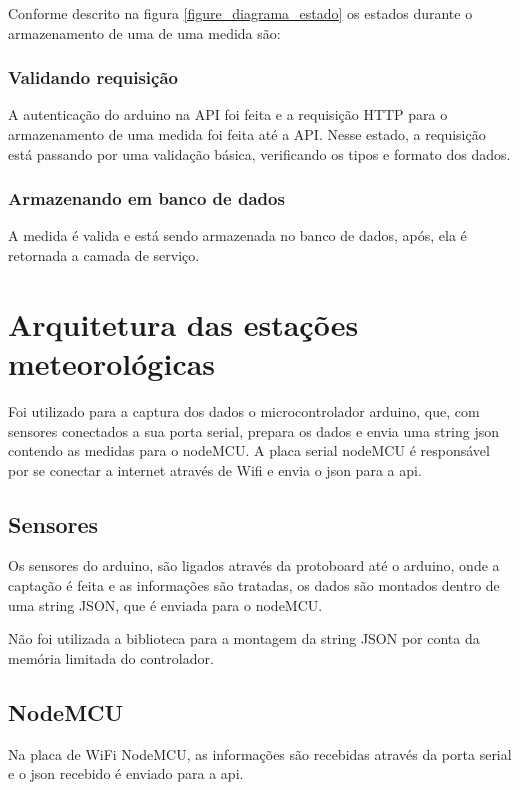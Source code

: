 Conforme descrito na figura \ref{figure_diagrama_estado} os estados durante o armazenamento de uma de uma medida são:

\subsubsection{Validando requisição}

A autenticação do arduino na API foi feita e a requisição HTTP para o armazenamento de uma medida foi feita até a API.
Nesse estado, a requisição está passando por uma validação básica, verificando os tipos e formato dos dados.

\subsubsection{Armazenando em banco de dados}

A medida é valida e está sendo armazenada no banco de dados, após, ela é retornada a camada de serviço.

\section{Arquitetura das estações meteorológicas}

Foi utilizado para a captura dos dados o microcontrolador arduino, que, com sensores conectados a sua porta serial, prepara os dados e envia uma string json contendo as medidas para o nodeMCU.
A placa serial nodeMCU é responsável por se conectar a internet através de Wifi e envia o json para a api.

\subsection{Sensores}

Os sensores do arduino, são ligados através da protoboard até o arduino, onde a captação é feita e as informações são tratadas, os dados são montados dentro de uma string JSON, que é enviada para o nodeMCU.

Não foi utilizada a biblioteca para a montagem da string JSON por conta da memória limitada do controlador.

\subsection{NodeMCU}

Na placa de WiFi NodeMCU, as informações são recebidas através da porta serial e o json recebido é enviado para a api.


